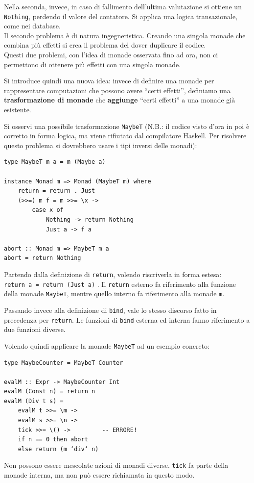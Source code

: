 \documentclass{article}
\begin{document}
Nella seconda, invece, in caso di fallimento dell'ultima valutazione si ottiene un \texttt{Nothing}, perdendo il valore del contatore. Si applica una logica transazionale, come nei database.\vspace{14pt}\\
Il secondo problema è di natura ingegneristica. Creando una singola monade che combina più effetti si crea il problema del dover duplicare il codice.\vspace{14pt}\\
Questi due problemi, con l'idea di monade osservata fino ad ora, non ci permettono di ottenere più effetti con una singola monade.

Si introduce quindi una nuova idea: invece di definire una monade per rappresentare computazioni che possono avere “certi effetti”, definiamo una \textbf{trasformazione di monade} che \textbf{aggiunge} “certi effetti” a una monade già esistente.

Si osservi una possibile trasformazione \texttt{MaybeT} (N.B.: il codice visto d'ora in poi è corretto in forma logica, ma viene rifiutato dal compilatore Haskell. Per risolvere questo problema si dovrebbero usare i tipi inversi delle monadi):
\begin{tcolorbox}
\begin{verbatim}
type MaybeT m a = m (Maybe a)

instance Monad m => Monad (MaybeT m) where
    return = return . Just
    (>>=) m f = m >>= \x ->
        case x of
            Nothing -> return Nothing
            Just a -> f a

abort :: Monad m => MaybeT m a
abort = return Nothing
\end{verbatim}
\end{tcolorbox}
Partendo dalla definizione di \texttt{return}, volendo riscriverla in forma estesa: \\ \texttt{return a = return (Just a)} . Il \texttt{return} esterno fa riferimento alla funzione della monade \texttt{MaybeT}, mentre quello interno fa riferimento alla monade \texttt{m}.

Passando invece alla definizione di \texttt{bind}, vale lo stesso discorso fatto in precedenza per \texttt{return}. Le funzioni di \texttt{bind} esterna ed interna fanno riferimento a due funzioni diverse.

\pagebreak

Volendo quindi applicare la monade \texttt{MaybeT} ad un esempio concreto:
\begin{tcolorbox}
\begin{verbatim}
type MaybeCounter = MaybeT Counter

evalM :: Expr -> MaybeCounter Int
evalM (Const n) = return n
evalM (Div t s) =
    evalM t >>= \m ->
    evalM s >>= \n ->
    tick >>= \() ->         -- ERRORE!
    if n == 0 then abort
    else return (m ‘div‘ n)
\end{verbatim}
\end{tcolorbox}
Non possono essere mescolate azioni di monadi diverse. \texttt{tick} fa parte della monade interna, ma non può essere richiamata in questo modo.
\end{document}

